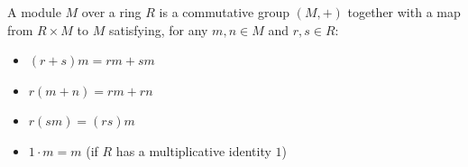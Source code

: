 A module $M$ over a ring $R$ is a commutative group $(M, +)$ together with a map from $R \times M$ to $M$ satisfying, for any $m, n \in M$ and $r, s \in R$:

\begin{itemize}
\item[(1)] $(r + s)m = rm + sm$
\item[(2)] $r(m + n) = rm + rn$
\item[(3)] $r(sm) = (rs)m$
\item[(4)] $1 \cdot m = m$ (if $R$ has a multiplicative identity $1$)
\end{itemize}
